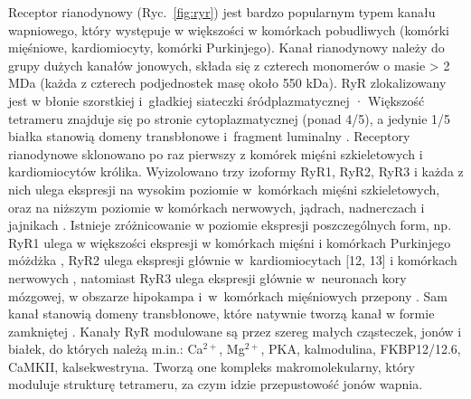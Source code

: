 Receptor rianodynowy (Ryc.~\ref{fig:ryr}) jest bardzo popularnym typem kanału wapniowego, który występuje w większości w komórkach pobudliwych (komórki mięśniowe, kardiomiocyty, komórki Purkinjego). Kanał rianodynowy należy do grupy dużych kanałów jonowych, składa się z czterech monomerów o masie > 2 MDa (każda z czterech podjednostek masę około 550 kDa). RyR zlokalizowany jest w błonie szorstkiej i~gładkiej siateczki śródplazmatycznej \cite{Berridge2012}· Większość tetrameru znajduje się po stronie cytoplazmatycznej (ponad 4/5), a jedynie 1/5 białka stanowią domeny transbłonowe i~fragment luminalny \cite{Wehrens2005}. Receptory rianodynowe sklonowano po raz pierwszy z komórek mięśni szkieletowych \cite{Marks1989,Takeshima1989} i kardiomiocytów \cite{Otsu1990} królika. Wyizolowano trzy izoformy RyR1, RyR2, RyR3 i każda z nich ulega ekspresji na wysokim poziomie w~komórkach mięśni szkieletowych, oraz na niższym poziomie w komórkach nerwowych, jądrach, nadnerczach i jajnikach \cite{Wehrens2005}. Istnieje zróżnicowanie w poziomie ekspresji poszczególnych form, np. RyR1 ulega w większości ekspresji w komórkach mięśni i komórkach Purkinjego móżdżka \cite{Furuichi1994,Hertle2008,Otsu1990,Takeshima1989}, RyR2 ulega ekspresji głównie w~kardiomiocytach [12, 13] i komórkach nerwowych \cite{Hertle2008}, natomiast RyR3 ulega ekspresji głównie w~neuronach kory mózgowej, w obszarze hipokampa i~w~komórkach mięśniowych przepony \cite{Franzini-Armstrong2005,Lanner2012,Mackrill2012}. Sam kanał stanowią domeny transbłonowe, które natywnie tworzą kanał w formie zamkniętej \cite{Kimlicka2013}. Kanały RyR modulowane są przez szereg małych cząsteczek, jonów i białek, do których należą m.in.: Ca$^{2+}$, Mg$^{2+}$, PKA, kalmodulina, FKBP12/12.6, CaMKII, kalsekwestryna. Tworzą one kompleks makromolekularny, który moduluje strukturę tetrameru, za czym idzie przepustowość jonów wapnia.


